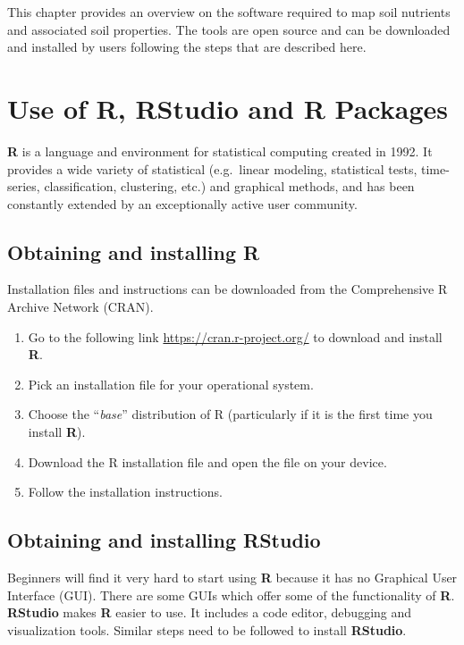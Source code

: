 \documentclass[
  10pt,
  b5paper,
  oneside]{book}
\providecommand{\tightlist}{%
  \setlength{\itemsep}{0pt}\setlength{\parskip}{0pt}}
\begin{document}
This chapter provides an overview on the software required to map soil nutrients and associated soil properties. The tools are open source and can be downloaded and installed by users following the steps that are described here.

\hypertarget{use-of-r-rstudio-and-r-packages}{%
\section{Use of R, RStudio and R Packages}\label{use-of-r-rstudio-and-r-packages}}

\textbf{R} is a language and environment for statistical computing created in 1992. It provides a wide variety of statistical (e.g.~linear modeling, statistical tests, time-series, classification, clustering, etc.) and graphical methods, and has been constantly extended by an exceptionally active user community.

\hypertarget{obtaining-and-installing-r}{%
\subsection{Obtaining and installing R}\label{obtaining-and-installing-r}}

Installation files and instructions can be downloaded from the Comprehensive R Archive Network (CRAN).

\begin{enumerate}
\def\labelenumi{\arabic{enumi}.}
\tightlist
\item
  Go to the following link \url{https://cran.r-project.org/} to download and install \textbf{R}.
\item
  Pick an installation file for your operational system.
\item
  Choose the ``\emph{base}'' distribution of R (particularly if it is the first time you install \textbf{R}).
\item
  Download the R installation file and open the file on your device.
\item
  Follow the installation instructions.
\end{enumerate}

\hypertarget{obtaining-and-installing-rstudio}{%
\subsection{Obtaining and installing RStudio}\label{obtaining-and-installing-rstudio}}

Beginners will find it very hard to start using \textbf{R} because it has no Graphical User Interface (GUI). There are some GUIs which offer some of the functionality of \textbf{R}. \textbf{RStudio} makes \textbf{R} easier to use. It includes a code editor, debugging and visualization tools. Similar steps need to be followed to install \textbf{RStudio}.
\end{document}
